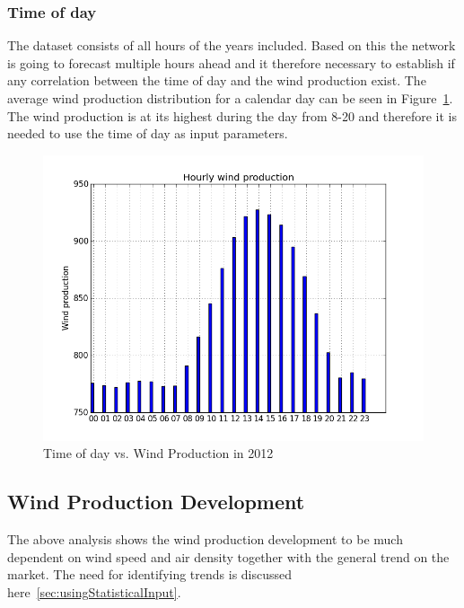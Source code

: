 \subsubsection{Time of day}
The dataset consists of all hours of the years included. Based on this the network is going to forecast multiple hours ahead and it therefore necessary to establish if any correlation between the time of day and the wind production exist. The average wind production distribution for a calendar day can be seen in Figure~\ref{fig:hourly_wind_production}. The wind production is at its highest during the day from 8-20 and therefore it is needed to use the time of day as input parameters.  

\begin{figure}[H]
\centering
\includegraphics[width=0.99\linewidth,natwidth=898,natheight=587]{billeder/hourly_wind_production.png}
\caption{Time of day vs. Wind Production in 2012}
\label{fig:hourly_wind_production}
\end{figure}

\subsection{Wind Production Development}
\label{sec:windProductionDev}
The above analysis shows the wind production development to be much dependent on wind speed and air density together with the general trend on the market. The need for identifying trends is discussed here~\ref{sec:usingStatisticalInput}. 

